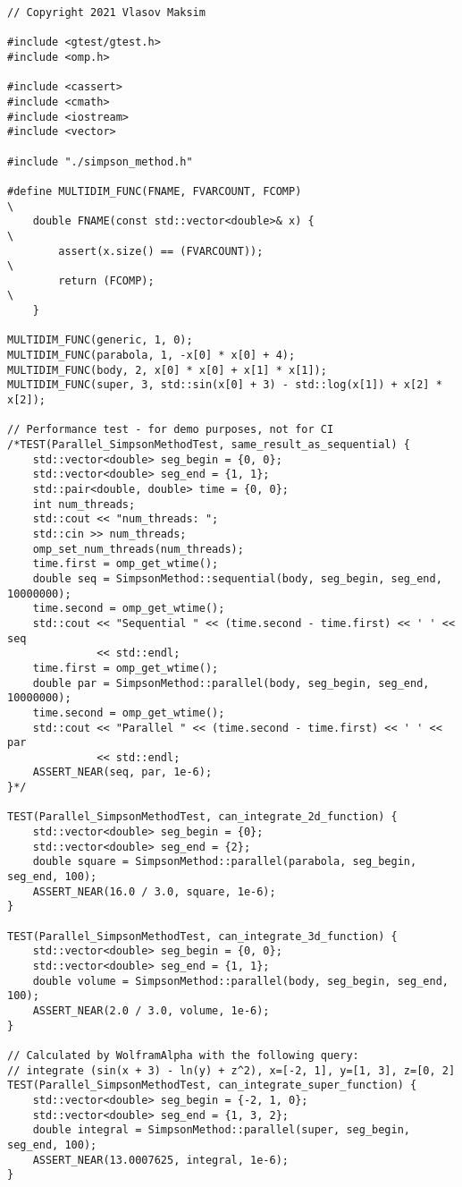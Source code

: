 \documentclass{report}
\begin{document}
\begin{lstlisting}
// Copyright 2021 Vlasov Maksim

#include <gtest/gtest.h>
#include <omp.h>

#include <cassert>
#include <cmath>
#include <iostream>
#include <vector>

#include "./simpson_method.h"

#define MULTIDIM_FUNC(FNAME, FVARCOUNT, FCOMP)                                 \
    double FNAME(const std::vector<double>& x) {                               \
        assert(x.size() == (FVARCOUNT));                                       \
        return (FCOMP);                                                        \
    }

MULTIDIM_FUNC(generic, 1, 0);
MULTIDIM_FUNC(parabola, 1, -x[0] * x[0] + 4);
MULTIDIM_FUNC(body, 2, x[0] * x[0] + x[1] * x[1]);
MULTIDIM_FUNC(super, 3, std::sin(x[0] + 3) - std::log(x[1]) + x[2] * x[2]);

// Performance test - for demo purposes, not for CI
/*TEST(Parallel_SimpsonMethodTest, same_result_as_sequential) {
    std::vector<double> seg_begin = {0, 0};
    std::vector<double> seg_end = {1, 1};
    std::pair<double, double> time = {0, 0};
    int num_threads;
    std::cout << "num_threads: ";
    std::cin >> num_threads;
    omp_set_num_threads(num_threads);
    time.first = omp_get_wtime();
    double seq = SimpsonMethod::sequential(body, seg_begin, seg_end, 10000000);
    time.second = omp_get_wtime();
    std::cout << "Sequential " << (time.second - time.first) << ' ' << seq
              << std::endl;
    time.first = omp_get_wtime();
    double par = SimpsonMethod::parallel(body, seg_begin, seg_end, 10000000);
    time.second = omp_get_wtime();
    std::cout << "Parallel " << (time.second - time.first) << ' ' << par
              << std::endl;
    ASSERT_NEAR(seq, par, 1e-6);
}*/

TEST(Parallel_SimpsonMethodTest, can_integrate_2d_function) {
    std::vector<double> seg_begin = {0};
    std::vector<double> seg_end = {2};
    double square = SimpsonMethod::parallel(parabola, seg_begin, seg_end, 100);
    ASSERT_NEAR(16.0 / 3.0, square, 1e-6);
}

TEST(Parallel_SimpsonMethodTest, can_integrate_3d_function) {
    std::vector<double> seg_begin = {0, 0};
    std::vector<double> seg_end = {1, 1};
    double volume = SimpsonMethod::parallel(body, seg_begin, seg_end, 100);
    ASSERT_NEAR(2.0 / 3.0, volume, 1e-6);
}

// Calculated by WolframAlpha with the following query:
// integrate (sin(x + 3) - ln(y) + z^2), x=[-2, 1], y=[1, 3], z=[0, 2]
TEST(Parallel_SimpsonMethodTest, can_integrate_super_function) {
    std::vector<double> seg_begin = {-2, 1, 0};
    std::vector<double> seg_end = {1, 3, 2};
    double integral = SimpsonMethod::parallel(super, seg_begin, seg_end, 100);
    ASSERT_NEAR(13.0007625, integral, 1e-6);
}


\end{lstlisting}
\end{document}
